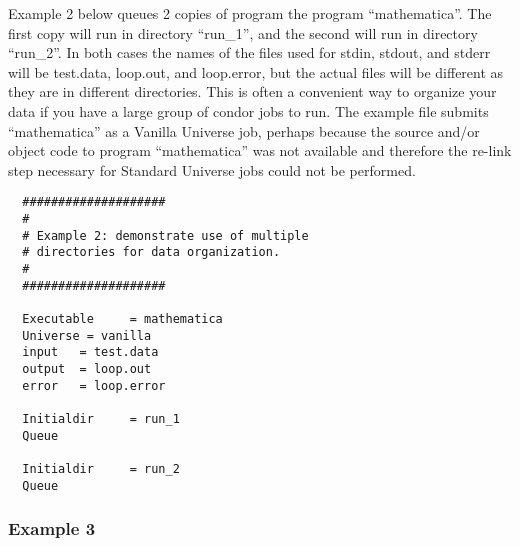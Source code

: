 Example 2 below queues 2 copies of program the program ``mathematica''. The
first copy will run in directory ``run\_1'', and the second will run in
directory ``run\_2''. In both cases the names of the files used for stdin,
stdout, and stderr will be test.data, loop.out, and loop.error,
but the actual files will be different as they are in different
directories. This is often a convenient way to organize your data if you
have a large group of condor jobs to run. The example file submits
``mathematica'' as a Vanilla Universe job, perhaps because the source
and/or object code to program ``mathematica'' was not available and
therefore the re-link step necessary for Standard Universe jobs could not
be performed. 
\begin{verbatim}
  ####################     
  #                       
  # Example 2: demonstrate use of multiple     
  # directories for data organization.      
  #                                        
  ####################                    
                                         
  Executable     = mathematica          
  Universe = vanilla                   
  input   = test.data                
  output  = loop.out                
  error   = loop.error             
                                  
  Initialdir     = run_1         
  Queue                         
                               
  Initialdir     = run_2      
  Queue                     
\end{verbatim}

\subsubsection{Example 3}


